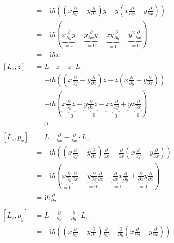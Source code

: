 \begin{align*}
        &= -\text{i}\hbar \left( \left( x\frac{\partial}{\partial y} - y\frac{\partial}{\partial x} \right)y - y\left( x\frac{\partial}{\partial y} - y\frac{\partial}{\partial x} \right) \right)\\
        &= -\text{i}\hbar \left( \underbrace{x\frac{\partial}{\partial y}y}_{=x} - \underbrace{y\frac{\partial}{\partial x}y}_{=0} - \underbrace{xy\frac{\partial}{\partial y}}_{=0} + \underbrace{y^2\frac{\partial}{\partial x}}_{=0} \right)\\
        &= -\text{i}\hbar x\\
        \\
        \left[ L_z,z \right] &= L_z\cdot z - z \cdot L_z\\
        &= -\text{i}\hbar \left( \left( x\frac{\partial}{\partial y} - y\frac{\partial}{\partial x} \right)z - z\left( x\frac{\partial}{\partial y} - y\frac{\partial}{\partial x} \right) \right)\\
        &= -\text{i}\hbar \left( \underbrace{x\frac{\partial}{\partial y}z}_{=0} - \underbrace{y\frac{\partial}{\partial x}z}_{=0} - \underbrace{xz\frac{\partial}{\partial y}}_{=0} + \underbrace{yz\frac{\partial}{\partial x}}_{=0} \right)\\
        &= 0\\
        \\
        \left[ L_z,p_x \right] &= L_z\cdot \frac{\partial}{\partial x} - \frac{\partial}{\partial x} \cdot L_z\\
        &= -\text{i}\hbar \left( \left( x\frac{\partial}{\partial y} - y\frac{\partial}{\partial x} \right) \frac{\partial}{\partial x} -\frac{\partial}{\partial x} \left( x\frac{\partial}{\partial y} - y\frac{\partial}{\partial x} \right) \right)\\
        &= -\text{i}\hbar \left( \underbrace{x\frac{\partial}{\partial y}}_{=0}\frac{\partial}{\partial x} - \underbrace{y\frac{\partial}{\partial x}}_{=0}\frac{\partial}{\partial x} - \underbrace{\frac{\partial}{\partial x}x}_{=1}\frac{\partial}{\partial y} + \underbrace{\frac{\partial}{\partial x}y}_{=0}\frac{\partial}{\partial x} \right)\\
        &= \text{i}\hbar \frac{\partial}{\partial y}\\
        \\
        \left[ L_z,p_y \right] &= L_z\cdot \frac{\partial}{\partial y} - \frac{\partial}{\partial y} \cdot L_z\\
        &= -\text{i}\hbar \left( \left( x\frac{\partial}{\partial y} - y\frac{\partial}{\partial x} \right) \frac{\partial}{\partial y} - \frac{\partial}{\partial y} \left( x\frac{\partial}{\partial y} - y\frac{\partial}{\partial x} \right) \right)\\

\end{align*}
